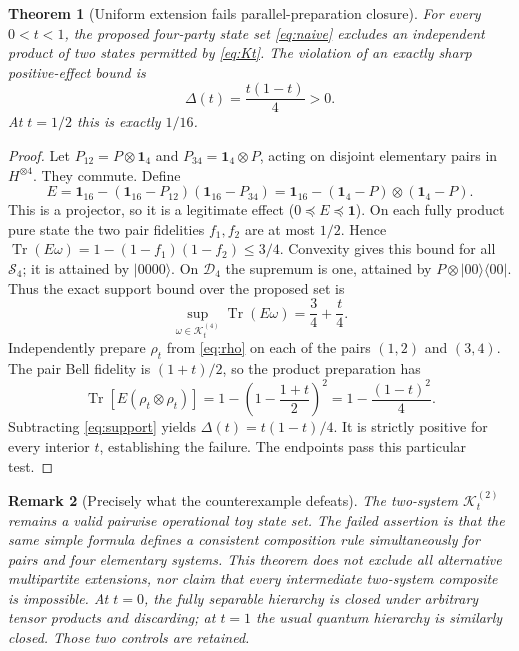 \documentclass[11pt,letterpaper]{article}
\newtheorem{theorem}{Theorem}
\newtheorem{remark}[theorem]{Remark}
\newcommand{\D}{\mathcal{D}}
\newcommand{\Ssep}{\mathcal{S}}
\newcommand{\K}{\mathcal{K}}
\newcommand{\tr}{\operatorname{Tr}}
\newcommand{\id}{\mathbf{1}}
\begin{document}
\begin{theorem}[Uniform extension fails parallel-preparation closure]
\label{thm:four}
For every $0<t<1$, the proposed four-party state set \eqref{eq:naive}
excludes an independent product of two states permitted by \eqref{eq:Kt}.
The violation of an exactly sharp positive-effect bound is
\begin{equation}\label{eq:gap}
\Delta(t)=\frac{t(1-t)}4>0.
\end{equation}
At $t=1/2$ this is exactly $1/16$.
\end{theorem}
\begin{proof}
Let $P_{12}=P\otimes\id_4$ and $P_{34}=\id_4\otimes P$,
acting on disjoint elementary pairs in $H^{\otimes4}$. They commute. Define
\[
E=\id_{16}-(\id_{16}-P_{12})(\id_{16}-P_{34})
=\id_{16}-(\id_4-P)\otimes(\id_4-P).
\]
This is a projector, so it is a legitimate effect ($0\preceq E\preceq\id$).
On each fully product pure state the two pair fidelities $f_1,f_2$ are at most
$1/2$. Hence $\tr(E\omega)=1-(1-f_1)(1-f_2)\leq3/4$.
Convexity gives this bound for all $\Ssep_4$; it is attained by $|0000\rangle$.
On $\D_4$ the supremum is one, attained by $P\otimes|00\rangle\langle00|$.
Thus the exact support bound over the proposed set is
\begin{equation}\label{eq:support}
\sup_{\omega\in\K_t^{(4)}}\tr(E\omega)=\frac34+\frac t4.
\end{equation}
Independently prepare $\rho_t$ from \eqref{eq:rho} on each of the pairs
$(1,2)$ and $(3,4)$. The pair Bell fidelity is $(1+t)/2$, so the product
preparation has
\[
\tr[E(\rho_t\otimes\rho_t)]
=1-\left(1-\frac{1+t}{2}\right)^2
=1-\frac{(1-t)^2}{4}.
\]
Subtracting \eqref{eq:support} yields $\Delta(t)=t(1-t)/4$.
It is strictly positive for every interior $t$, establishing the failure.
The endpoints pass this particular test.\end{proof}

\begin{remark}[Precisely what the counterexample defeats]
The two-system $\K_t^{(2)}$ remains a valid \emph{pairwise} operational toy
state set. The failed assertion is that the same simple formula defines a
consistent composition rule simultaneously for pairs and four elementary
systems. This theorem does not exclude all alternative multipartite extensions,
nor claim that every intermediate two-system composite is impossible. At
$t=0$, the fully separable hierarchy is closed under arbitrary tensor
products and discarding; at $t=1$ the usual quantum hierarchy is similarly
closed. Those two controls are retained.
\end{remark}
\end{document}
